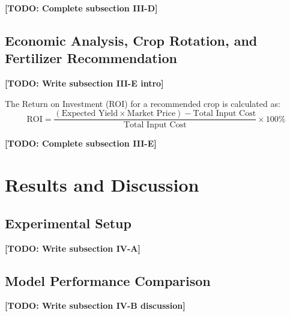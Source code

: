 \documentclass[conference]{IEEEtran}
\begin{document}
\textbf{[TODO: Complete subsection III-D]}

\subsection{Economic Analysis, Crop Rotation, and Fertilizer Recommendation}
\textbf{[TODO: Write subsection III-E intro]}

The Return on Investment (ROI) for a recommended crop is calculated as:
\begin{equation}
    \text{ROI} = \frac{(\text{Expected Yield} \times \text{Market Price}) - \text{Total Input Cost}}{\text{Total Input Cost}} \times 100\%
    \label{eq:roi}
\end{equation}

\textbf{[TODO: Complete subsection III-E]}

\section{Results and Discussion}
\label{sec:results}

\subsection{Experimental Setup}
\textbf{[TODO: Write subsection IV-A]}

\subsection{Model Performance Comparison}
\textbf{[TODO: Write subsection IV-B discussion]}
\end{document}
